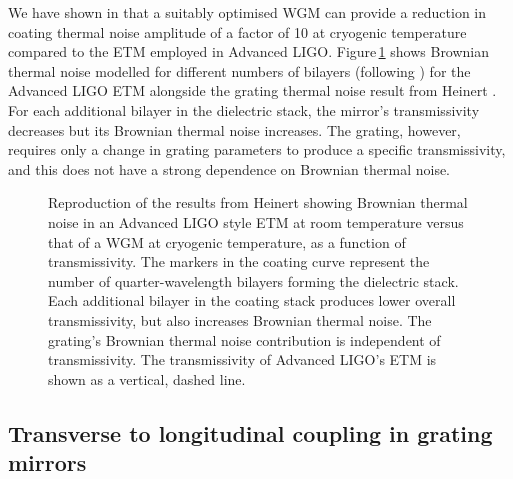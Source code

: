 We have shown in \cite{Heinert2013} that a suitably optimised \gls{WGM} can provide a reduction in coating thermal noise amplitude of a factor of 10 at cryogenic temperature compared to the \gls{ETM} employed in Advanced LIGO. Figure\,\ref{fig:coating-vs-grating-noise} shows Brownian thermal noise modelled for different numbers of bilayers (following \cite{Harry2002}) for the Advanced LIGO \gls{ETM} alongside the grating thermal noise result from Heinert \etal{}. For each additional bilayer in the dielectric stack, the mirror's transmissivity decreases but its Brownian thermal noise increases. The grating, however, requires only a change in grating parameters to produce a specific transmissivity, and this does not have a strong dependence on Brownian thermal noise.

\begin{figure}
  \centering
  
  \caption[Brownian thermal noise in an Advanced LIGO style end test mass at room temperature versus that of a waveguide mirror at cryogenic temperature, as a function of transmissivity]{\label{fig:coating-vs-grating-noise}Reproduction of the results from Heinert \etal{} \cite{Heinert2013} showing Brownian thermal noise in an Advanced LIGO style \gls{ETM} at room temperature versus that of a \gls{WGM} at cryogenic temperature, as a function of transmissivity. The markers in the coating curve represent the number of quarter-wavelength bilayers forming the dielectric stack. Each additional bilayer in the coating stack produces lower overall transmissivity, but also increases Brownian thermal noise. The grating's Brownian thermal noise contribution is independent of transmissivity. The transmissivity of Advanced LIGO's \gls{ETM} is shown as a vertical, dashed line.}
\end{figure}

\subsection{Transverse to longitudinal coupling in grating mirrors}

